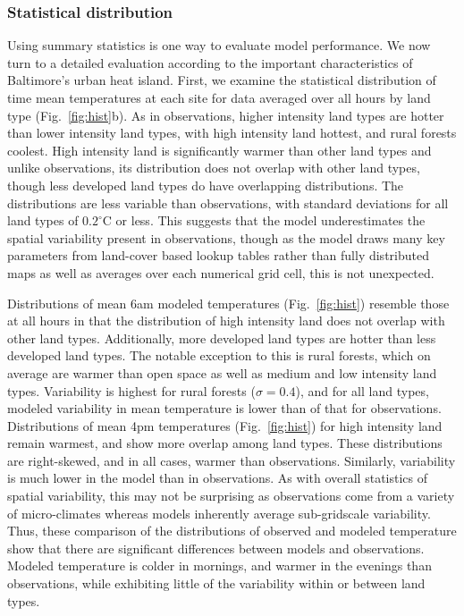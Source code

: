 \documentclass[draft,linenumbers]{agujournal}
\begin{document}
\subsubsection{Statistical distribution}
Using summary statistics is one way to evaluate model performance. %
We now turn to a detailed evaluation according to the important characteristics of Baltimore's urban heat island. 
First, we examine the statistical distribution of time mean temperatures at each site for data averaged over all hours by land type (Fig.~\ref{fig:hist}b). 
As in observations, higher intensity land types are hotter than lower intensity land types, with high intensity land hottest, and rural forests coolest. High intensity land is significantly warmer than other land types and unlike observations, its distribution does not overlap with other land types, though less developed land types do have overlapping distributions. 
The distributions are less variable than observations, with standard deviations for all land types of $0.2^\circ$C or less. This suggests that the model underestimates the spatial variability present in observations, though as the model draws many key parameters from land-cover based lookup tables rather than fully distributed maps as well as averages over each numerical grid cell, this is not unexpected. 

Distributions of mean 6am modeled temperatures (Fig.~\ref{fig:hist}) resemble those at all hours in that the distribution of high intensity land does not overlap with other land types. Additionally, more developed land types are hotter than less developed land types. The notable exception to this is rural forests, which on average are warmer than open space as well as medium and low intensity land types. Variability is highest for rural forests ($\sigma = 0.4$), and for all land types, modeled variability in mean temperature is lower than of that for observations. Distributions of mean 4pm temperatures (Fig.~\ref{fig:hist}) for high intensity land remain warmest, and show more overlap among land types. These distributions are right-skewed, and in all cases, warmer than observations. Similarly, variability is much lower in the model than in observations. As with overall statistics of spatial variability, this may not be surprising as observations come from a variety of micro-climates whereas models inherently average sub-gridscale variability. Thus, these comparison of the distributions of observed and modeled temperature show that there are significant differences between models and observations. Modeled temperature is colder in mornings, and warmer in the evenings than observations, while exhibiting little of the variability within or between land types. 
\end{document}

